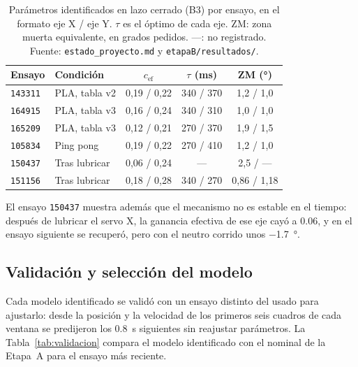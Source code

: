 \begin{table}[!t]
\caption{Parámetros identificados en lazo cerrado (B3) por ensayo, en el formato eje X / eje
Y. $\tau$ es el óptimo de cada eje. ZM: zona muerta equivalente, en grados pedidos. ---: no
registrado. Fuente:
\texttt{estado\_proyecto.md} y \texttt{etapaB/resultados/}.}
\label{tab:b3}
\centering
\footnotesize
\setlength{\tabcolsep}{3pt}
\begin{tabular}{@{}llccc@{}}
\toprule
\textbf{Ensayo} & \textbf{Condición} & $c_{\mathrm{ef}}$ & $\tau$ (\si{\milli\second}) & ZM (\si{\degree}) \\
\midrule
\texttt{143311} & PLA, tabla v2      & 0,19 / 0,22 & 340 / 370 & 1,2 / 1,0 \\
\texttt{164915} & PLA, tabla v3      & 0,16 / 0,24 & 340 / 310 & 1,0 / 1,0 \\
\texttt{165209} & PLA, tabla v3      & 0,12 / 0,21 & 270 / 370 & 1,9 / 1,5 \\
\texttt{105834} & Ping pong          & 0,19 / 0,22 & 270 / 410 & 1,2 / 1,0 \\
\texttt{150437} & Tras lubricar      & 0,06 / 0,24 & --- & 2,5 / --- \\
\texttt{151156} & Tras lubricar      & 0,18 / 0,28 & 340 / 270 & 0,86 / 1,18 \\
\bottomrule
\end{tabular}
\end{table}

El ensayo \texttt{150437} muestra además que el mecanismo no es estable en el tiempo: después
de lubricar el servo X, la ganancia efectiva de ese eje cayó a \num{0.06}, y en el ensayo
siguiente se recuperó, pero con el neutro corrido unos \SI{-1.7}{\degree}.

\subsection{Validación y selección del modelo}

Cada modelo identificado se validó con un ensayo distinto del usado para ajustarlo: desde la
posición y la velocidad de los primeros seis cuadros de cada ventana se predijeron los
\SI{0.8}{\second} siguientes sin reajustar parámetros. La Tabla~\ref{tab:validacion} compara el
modelo identificado con el nominal de la Etapa~A para el ensayo más reciente.

